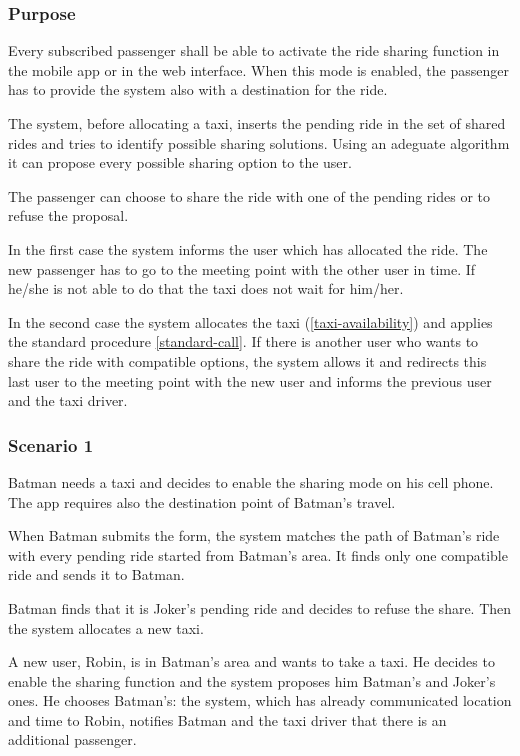 \label{ride-sharing}
\subsubsection{Purpose}

Every subscribed passenger shall be able to activate the ride sharing function in the mobile app or in the web interface. When this mode is enabled, the passenger has to provide the system also with a destination for the ride.

The system, before allocating a taxi, inserts the pending ride in the set of shared rides and tries to identify possible sharing solutions. Using an adeguate algorithm it can propose every possible sharing option to the user. 

The passenger can choose to share the ride with one of the pending rides or to refuse the proposal.

In the first case the system informs the user which has allocated the ride. The new passenger has to go to the meeting point with the other user in time. If he/she is not able to do that the taxi does not wait for him/her.

In the second case the system allocates the taxi (\ref{taxi-availability}) and applies the standard procedure \ref{standard-call}. If there is another user who wants to share the ride with compatible options, the system allows it and redirects this last user to the meeting point with the new user and informs the previous user and the taxi driver.

\subsubsection{Scenario 1}
Batman needs a taxi and decides to enable the sharing mode on his cell phone. The app requires also the destination point of Batman's travel.
 
When Batman submits the form, the system matches the path of Batman's ride with every pending ride started from Batman's area. It finds only one compatible ride and sends it to Batman.
 
 Batman finds that it is Joker's pending ride and decides to refuse the share. Then the system allocates a new taxi.
 
 A new user, Robin, is in Batman's area and wants to take a taxi. He decides to enable the sharing function and the system proposes him Batman's and Joker's ones. He chooses Batman's: the system, which has already communicated location and time to Robin, notifies Batman and the taxi driver that there is an additional passenger.
 
